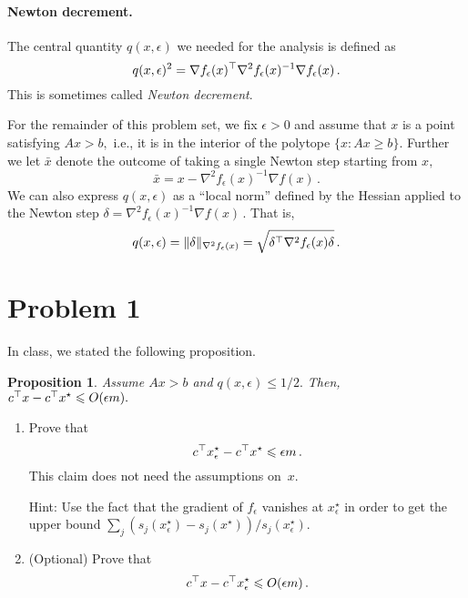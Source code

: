 \documentclass[12pt]{article}
\newtheorem{prop}{Proposition}
\begin{document}
\paragraph{Newton decrement.}
The central quantity $q(x,\epsilon)$ we needed for the analysis is defined as
\[
q(x, \epsilon)^2
= \nabla f_\epsilon(x)^\top
\nabla^2 f_\epsilon(x)^{-1}\nabla f_\epsilon(x)\,.
\]
This is sometimes called \emph{Newton decrement}.

For the remainder of this problem set, we fix $\epsilon>0$ and 
assume that $x$ is a point satisfying
$Ax>b,$ i.e., it is in the interior of the polytope $\{x\colon Ax\ge b\}.$
Further we let $\bar x$ denote the outcome of taking a single Newton step
starting from $x,$
\[
\bar x =  x-\nabla^2 f_\epsilon(x)^{-1}\nabla f(x)\,.
\]
We can also express $q(x,\epsilon)$ as a ``local norm'' defined by the Hessian
applied to the Newton step
$\delta=\nabla^2 f_\epsilon(x)^{-1}\nabla f(x)\,.$
That is,
\[
q(x,\epsilon)=\|\delta\|_{\nabla^2
f_{\epsilon}(x)}=\sqrt{\delta^\top \nabla^2f_\epsilon(x)\delta}\,.
\]

\section{Problem 1}

In class, we stated the following
proposition.

\begin{prop}
Assume $Ax > b$ and $q(x,\epsilon)\le1/2.$ 
Then, $c^\top x - c^\top x^\star\leqslant O(\epsilon m).$
\end{prop}

\begin{enumerate}
\item
Prove that 
\[
c^\top x_{\epsilon}^\star - c^\top x^\star \leqslant \epsilon m\,.
\]
This claim does not need the assumptions on~$x.$

Hint: 
Use the fact that the gradient of $f_\epsilon$ vanishes at $x_\epsilon^\star$ in
order to get the upper bound $\sum_j
(s_j(x_\epsilon^\star)-s_j(x^\star))/s_j(x_\epsilon^\star).$
\item (Optional)
Prove that 
\[
c^\top x - c^\top x_{\epsilon}^\star 
\leqslant O(\epsilon m)\,.
\]
\end{enumerate}
%
\end{document}
